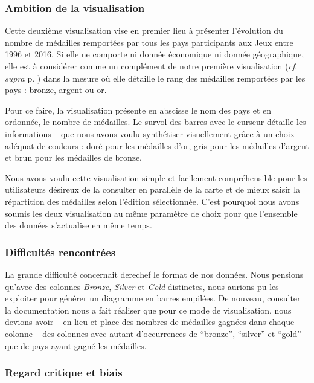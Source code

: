 \documentclass[hidelinks, 12pt]{report}
\begin{document}
\subsubsection{Ambition de la visualisation}

Cette deuxième visualisation vise en premier lieu à présenter l'évolution du nombre de médailles remportées par tous les pays participants aux Jeux entre 1996 et 2016. Si elle ne comporte ni donnée économique ni donnée géographique, elle est à considérer comme un complément de notre première visualisation (\textit{cf}. \textit{supra} p. \pageref{map}) dans la mesure où elle détaille le rang des médailles remportées par les pays : bronze, argent ou or.

Pour ce faire, la visualisation présente en abscisse le nom des pays et en ordonnée, le nombre de médailles. Le survol des barres avec le curseur détaille les informations -- que nous avons voulu synthétiser visuellement grâce à un choix adéquat de couleurs : doré pour les médailles d'or, gris pour les médailles d'argent et brun pour les médailles de bronze.

Nous avons voulu cette visualisation simple et facilement compréhensible pour les utilisateurs désireux de la consulter en parallèle de la carte et de mieux saisir la répartition des médailles selon l'édition sélectionnée. C'est pourquoi nous avons soumis les deux visualisation au même paramètre de choix pour que l'ensemble des données s'actualise en même temps.

\subsubsection{Difficultés rencontrées}

La grande difficulté concernait derechef le format de nos données. Nous pensions qu'avec des colonnes \textit{Bronze}, \textit{Silver} et \textit{Gold} distinctes, nous aurions pu les exploiter pour générer un diagramme en barres empilées. De nouveau, consulter la documentation nous a fait réaliser que pour ce mode de visualisation, nous devions avoir -- en lieu et place des nombres de médailles gagnées dans chaque colonne -- des colonnes avec autant d'occurrences de \enquote{bronze}, \enquote{silver} et \enquote{gold} que de pays ayant gagné les médailles.

\subsubsection{Regard critique et biais}
\end{document}
